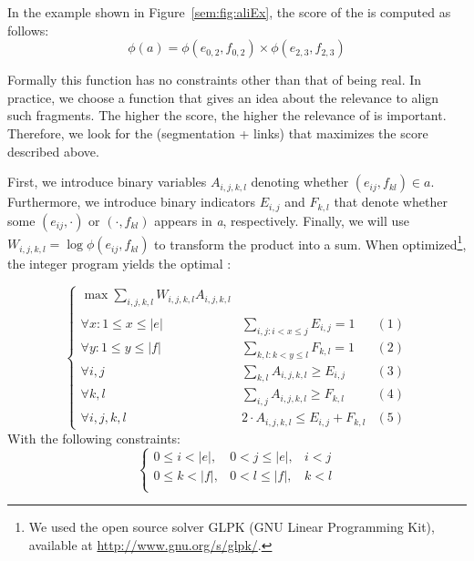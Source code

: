 \documentclass[output=paper,modfonts,nonflat]{langsci/langscibook}
\begin{document}
In the example shown in Figure~\ref{sem:fig:aliEx}, the score of the  is computed as follows:
\begin{equation}
\phi(a)=\phi(e_{0,2},f_{0,2}) \times \phi(e_{2,3},f_{2,3})
\end{equation}

Formally this function has no constraints other than that of being real. 
In practice, we choose a function that gives an idea about the relevance to align such fragments. 
The higher the score, the higher the relevance of  is important. 
Therefore, we look for the  (segmentation + links) that maximizes the score described above.

First, we introduce binary variables $A_{i,j,k,l}$ denoting whether $(e_{ij},f_{kl}) \in a$.
Furthermore, we introduce binary indicators $E_{i,j}$ and $F_{k,l}$ that denote whether some $(e_{ij} ,  \cdotp)$ or $(\cdotp, f_{kl})$ appears in \textit{a}, respectively. 
Finally, we will use $W_{i,j,k,l} = \log \phi(e_{ij},f_{kl})$ to transform the product into a sum.
When optimized\footnote{We used the open source solver GLPK (GNU Linear Programming Kit), available at \url{http://www.gnu.org/s/glpk/}.}, the integer program yields the optimal :

\begin{equation}
	\left\{\begin{array}{lll}
	    \max \sum\limits_{i,j,k,l}{W_{i,j,k,l}A_{i,j,k,l}}\\
	    \\
	    \forall x: 1\leq x\leq |e| & \sum\limits_{i,j: i<x\leq j}{E_{i,j}} = 1 &(1)\\
	    \forall y: 1\leq y\leq |f| & \sum\limits_{k,l: k<y\leq l}{F_{k,l}} = 1 &(2)\\
	    \forall i,j & \sum\limits_{k,l}{A_{i,j,k,l}} \geq E_{i,j} & (3)\\
	    \forall k,l & \sum\limits_{i,j}{A_{i,j,k,l}} \geq F_{k,l} & (4)\\
	    \forall i,j,k,l & 2\cdot A_{i,j,k,l} \leq E_{i,j}+F_{k,l} & (5)
	\end{array}\right.
\end{equation}
	With the following constraints:
\begin{equation}
	\left\{\begin{array}{lll}
	0 \leq i < |e|, & 0 < j \leq |e|, & i < j\\
	0 \leq k < |f|, & 0 < l \leq |f|, & k < l\\ 
	\end{array}\right.
\end{equation}
\end{document}
